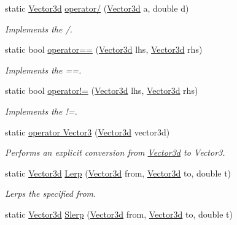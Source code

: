 \begin{DoxyCompactItemize}
static \hyperlink{struct_unity_engine_1_1_vector3d}{Vector3d} \hyperlink{struct_unity_engine_1_1_vector3d_a96ae9471376cf81626241d4634574ebc}{operator/} (\hyperlink{struct_unity_engine_1_1_vector3d}{Vector3d} a, double d)
\begin{DoxyCompactList}\small\item\em Implements the /. \end{DoxyCompactList}\item 
static bool \hyperlink{struct_unity_engine_1_1_vector3d_a73f60b5dd72497a724606d134c4c9a1a}{operator==} (\hyperlink{struct_unity_engine_1_1_vector3d}{Vector3d} lhs, \hyperlink{struct_unity_engine_1_1_vector3d}{Vector3d} rhs)
\begin{DoxyCompactList}\small\item\em Implements the ==. \end{DoxyCompactList}\item 
static bool \hyperlink{struct_unity_engine_1_1_vector3d_a6666f7c28524384b2929a7e41d71978a}{operator!=} (\hyperlink{struct_unity_engine_1_1_vector3d}{Vector3d} lhs, \hyperlink{struct_unity_engine_1_1_vector3d}{Vector3d} rhs)
\begin{DoxyCompactList}\small\item\em Implements the !=. \end{DoxyCompactList}\item 
static \hyperlink{struct_unity_engine_1_1_vector3d_add8275b06ebc0a571b143b8b96b3f1f6}{operator Vector3} (\hyperlink{struct_unity_engine_1_1_vector3d}{Vector3d} vector3d)
\begin{DoxyCompactList}\small\item\em Performs an explicit conversion from \hyperlink{struct_unity_engine_1_1_vector3d}{Vector3d} to Vector3. \end{DoxyCompactList}\item 
static \hyperlink{struct_unity_engine_1_1_vector3d}{Vector3d} \hyperlink{struct_unity_engine_1_1_vector3d_adc2ba969a9b59afcc12862e008e5662a}{Lerp} (\hyperlink{struct_unity_engine_1_1_vector3d}{Vector3d} from, \hyperlink{struct_unity_engine_1_1_vector3d}{Vector3d} to, double t)
\begin{DoxyCompactList}\small\item\em Lerps the specified from. \end{DoxyCompactList}\item 
static \hyperlink{struct_unity_engine_1_1_vector3d}{Vector3d} \hyperlink{struct_unity_engine_1_1_vector3d_a2a680d415e8ad6d100aef838d73a71d9}{Slerp} (\hyperlink{struct_unity_engine_1_1_vector3d}{Vector3d} from, \hyperlink{struct_unity_engine_1_1_vector3d}{Vector3d} to, double t)

\end{DoxyCompactItemize}
